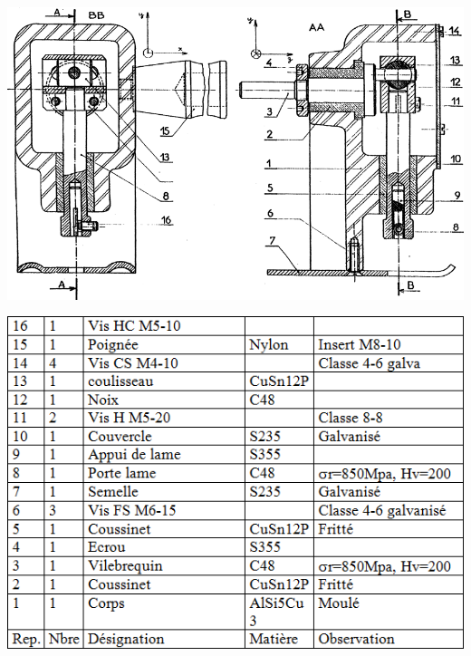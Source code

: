 \documentclass[11pt,oneside]{article}
\begin{document}
\begin{center}
\includegraphics[width=.7\textwidth]{png/scie1}

\vspace{.5cm}

\includegraphics[width=.5\textwidth]{png/nomenclature}
\end{center}
\end{document}
